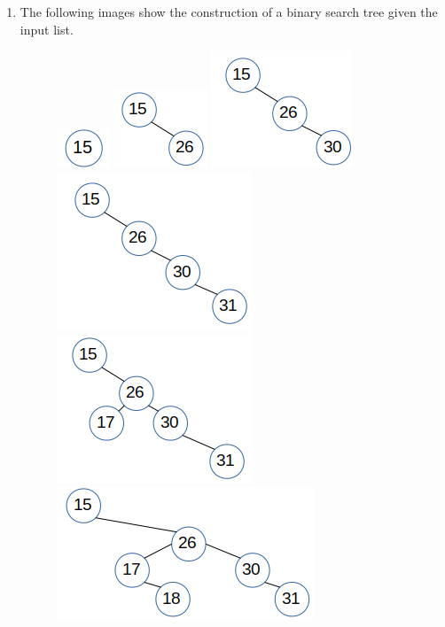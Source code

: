 \documentclass{article}
\begin{document}
\begin{enumerate}
\begin{lstlisting}
\end{lstlisting}

\noindent\rule{8cm}{0.4pt}


\item 
The following images show the construction of a binary search tree given the input list. 

\begin{figure}[H]
	\includegraphics[]{P10/0-15}
	\includegraphics[]{P10/1-26}
	\includegraphics[]{P10/2-30}
	\includegraphics[]{P10/3-31}
	\includegraphics[]{P10/4-17}
	\includegraphics[]{P10/5-18}

\end{figure}
\end{enumerate}
\end{document}
